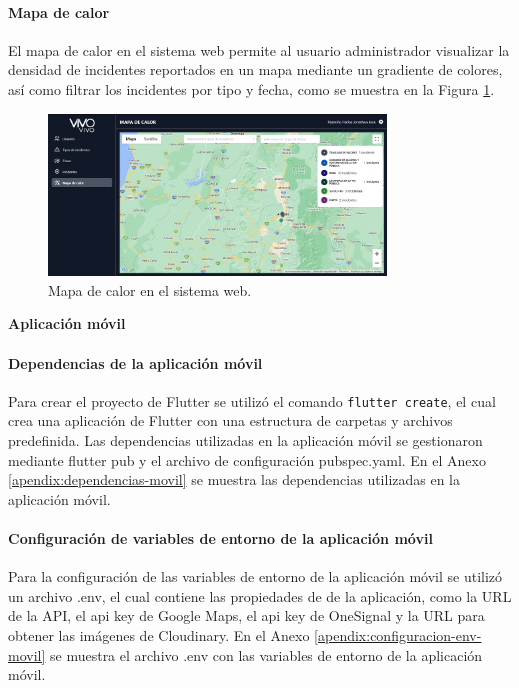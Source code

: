 \paragraph{Mapa de calor}
El mapa de calor en el sistema web permite al usuario administrador visualizar la densidad de incidentes reportados en un mapa
mediante un gradiente de colores, así como filtrar los incidentes por tipo y fecha, como se muestra en la Figura \ref{fig:mapa-de-calor-web}.

\begin{figure}[H]
    \centering
    \includegraphics[width=0.8\textwidth]{chapters/III-resultados-y-discusion/resources/images/mapa-de-calor-web.png}
    \caption{Mapa de calor en el sistema web.}
    \label{fig:mapa-de-calor-web}
\end{figure}

\textbf{Aplicación móvil}
\bigbreak

\paragraph{Dependencias de la aplicación móvil}
Para crear el proyecto de Flutter se utilizó el comando \texttt{flutter create}, el cual crea una aplicación de Flutter con
una estructura de carpetas y archivos predefinida. Las dependencias utilizadas en la aplicación móvil se gestionaron mediante flutter pub
y el archivo de configuración pubspec.yaml. En el Anexo \ref{apendix:dependencias-movil} se muestra las dependencias utilizadas en la
aplicación móvil.

\paragraph{Configuración de variables de entorno de la aplicación móvil}
Para la configuración de las variables de entorno de la aplicación móvil se utilizó un archivo .env, el cual contiene las propiedades de
de la aplicación, como la URL de la API, el api key de Google Maps, el api key de OneSignal y la URL para obtener las imágenes
de Cloudinary. En el Anexo \ref{apendix:configuracion-env-movil} se muestra el archivo .env con las variables de entorno de la aplicación móvil.

